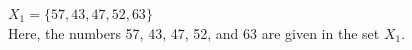 \begin{tcolorbox}
	$ X_1=\{   57, 43, 47, 52, 63\}$\\
	Here, the numbers 57, 43, 47, 52, and 63 are given in the set $X_1$.
\end{tcolorbox}
